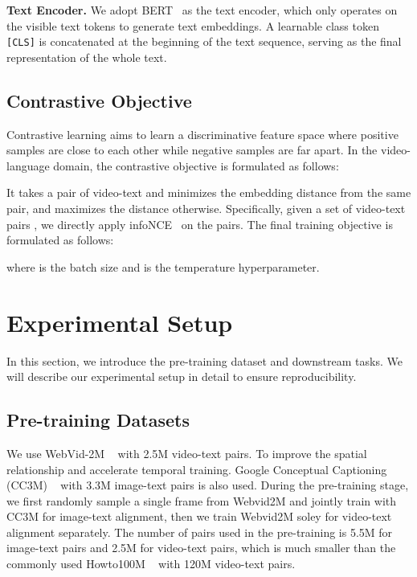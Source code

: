 \documentclass[10pt,twocolumn,letterpaper]{article}
\begin{document}
\vspace{1mm}\noindent\textbf{Text Encoder.} We adopt BERT~\cite{bert} as the text encoder, which only operates on the visible text tokens  to generate text embeddings. A learnable class token \verb+[CLS]+ is concatenated at the beginning of the text sequence, serving as the final representation of the whole text. 


\vspace{-1mm}\subsection{Contrastive Objective}\vspace{-1mm}
\label{sec:contrastive objective}
Contrastive learning aims to learn a discriminative feature space where positive samples are close to each other while negative samples are far apart. In the video-language domain, the contrastive objective is formulated as follows:

It takes a pair of video-text and minimizes the embedding distance from the same pair, and maximizes the distance otherwise. Specifically, given a set of video-text pairs , we directly apply infoNCE~\cite{cpc_infonce} on the pairs. The final training objective  is formulated as follows:




where  is the batch size and  is the temperature hyperparameter.

\vspace{-1mm}\section{Experimental Setup}
In this section, we introduce the pre-training dataset and downstream tasks. We will describe our experimental setup in detail to ensure reproducibility.

\vspace{-1mm}\subsection{Pre-training Datasets}

We use WebVid-2M ~\cite{Frozen} with 2.5M video-text pairs. To improve the spatial relationship and accelerate temporal training. Google Conceptual Captioning (CC3M) ~\cite{cc3m} with 3.3M image-text pairs is also used. During the pre-training stage, we first randomly sample a single frame from Webvid2M and jointly train with CC3M for image-text alignment, then we train Webvid2M soley for video-text alignment separately. The number of pairs used in the pre-training is 5.5M for image-text pairs and 2.5M for video-text pairs, which is much smaller than the commonly used Howto100M ~\cite{howto100m} with 120M video-text pairs.  
\end{document}
